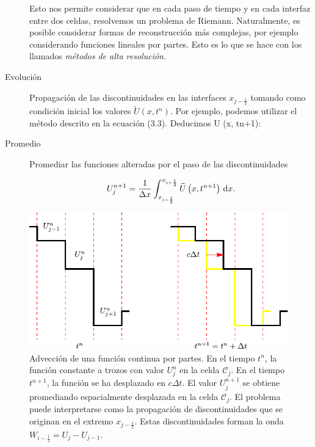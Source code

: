 \begin{description}
	      Esto nos permite considerar que en cada paso de tiempo y en cada interfaz entre dos celdas,
	      resolvemos un problema de Riemann.
	      Naturalmente, es posible considerar formas de reconstrucción más complejas,
	      por ejemplo considerando funciones lineales por partes.
	      Esto es lo que se hace con los llamados \emph{métodos de alta resolución}.

	\item[Evolución]

	      Propagación de las discontinuidades en las interfaces $x_{j-\frac{1}{2}}$ tomando como condición inicial los valores
	      \begin{math}
		      \widetilde{U}
		      \left(x,t^{n}\right)
	      \end{math}.
	      Por ejemplo, podemos utilizar el método descrito en la ecuación (3.3). Deducimos U (x, tn+1):

	\item[Promedio]

	      Promediar las funciones alteradas por el paso de las discontinuidades

	      \begin{equation*}
		      U^{n+1}_{j}=
		      \frac{1}{\Delta x}
		      \int_{x_{i-\frac{1}{2}}}^{x_{i+\frac{1}{2}}}
		      \widetilde{U}
		      \left(x,t^{n+1}\right)
		      \dl x.
	      \end{equation*}
\end{description}

\begin{figure}[ht!]
	\centering
	\includegraphics[width=.5\paperwidth]{piecewise}
	\caption{Advección de una función continua por partes.
	En el tiempo $t^{n}$, la función constante a trozos con valor $U^{n}_{j}$ en la celda $\mathcal{C}_{j}$.
	En el tiempo $t^{n+1}$, la función se ha desplazado en $c\Delta t$.
	El valor $U^{n+1}_{j}$ se obtiene promediando espacialmente desplazada en la celda $\mathcal{C}_{j}$.
	El problema puede interpretarse como la propagación de discontinuidades que se originan en el extremo
	$x_{j-\frac{1}{2}}$.
	Estas discontinuidades forman la onda $W_{i-\frac{1}{2}}=U_{j}-U_{j-1}$.}
	\label{fig:piecewise}
\end{figure}

